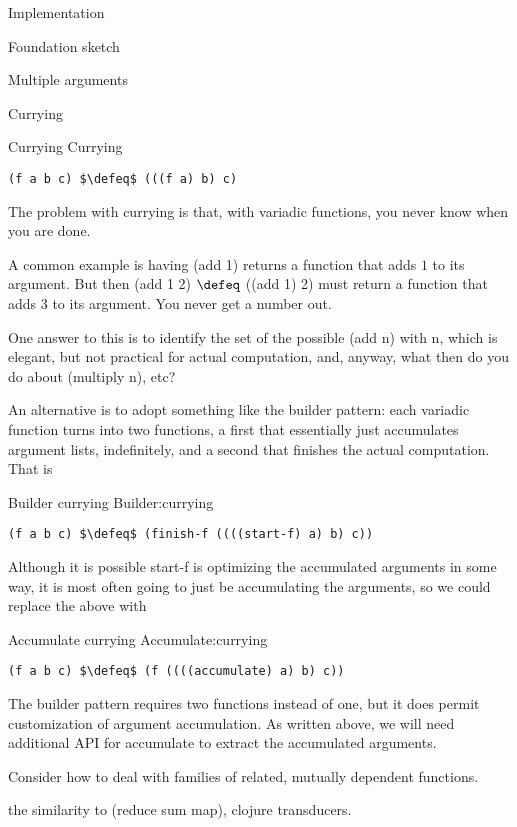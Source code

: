 \documentclass[11pt]{PalisadesLakesBook}
\begin{document}
\begin{plSection}{Implementation}
\begin{plSection}{Foundation sketch}
\begin{plSection}{Multiple arguments}
\begin{plSection}{Currying}
\begin{plListing}
{Currying}
{Currying}
\begin{lstlisting}[language=pseudocode]
(f a b c) $\defeq$ (((f a) b) c)
\end{lstlisting}
\end{plListing}

The problem with currying is that, with variadic functions,
you never know when you are done.

A common example is having
{\pseudocodeFont (add 1)} returns a function
that adds $1$ to its argument.
But then {\pseudocodeFont (add 1 2) $\defeq$  ((add 1) 2)}
must return a function that adds $3$ to its argument.
You never get a number out.

One answer to this is to identify the set of the possible
{\pseudocodeFont (add n)} with {\pseudocodeFont n},
which is elegant, but not practical for actual computation,
and, anyway, what then do you do about 
{\pseudocodeFont (multiply n)}, etc?

An alternative is to adopt something like the builder pattern:
each variadic function turns into two functions, 
a first that essentially just accumulates argument lists,
indefinitely, and a second that finishes the actual computation.
That is
\begin{plListing}
{Builder currying}
{Builder:currying}
\begin{lstlisting}[language=pseudocode]
(f a b c) $\defeq$ (finish-f ((((start-f) a) b) c))
\end{lstlisting}
\end{plListing}
Although it is possible {\pseudocodeFont start-f} 
is optimizing the accumulated arguments in some way,
it is most often going to just be accumulating the arguments,
so we could replace the above with
\begin{plListing}
{Accumulate currying}
{Accumulate:currying}
\begin{lstlisting}[language=pseudocode]
(f a b c) $\defeq$ (f ((((accumulate) a) b) c))
\end{lstlisting}
\end{plListing}
The builder pattern requires two functions instead of one,
but it does permit customization of argument accumulation.
As written above, we will need additional API for
{\pseudocodeFont accumulate} to extract the accumulated arguments.

\TODO
Consider how to deal with families 
of related, mutually dependent functions.

\NOTE
the similarity to {\pseudocodeFont (reduce sum map)},
clojure transducers.


\end{plSection}
\end{plSection}
\end{plSection}
\end{plSection}
\end{document}
